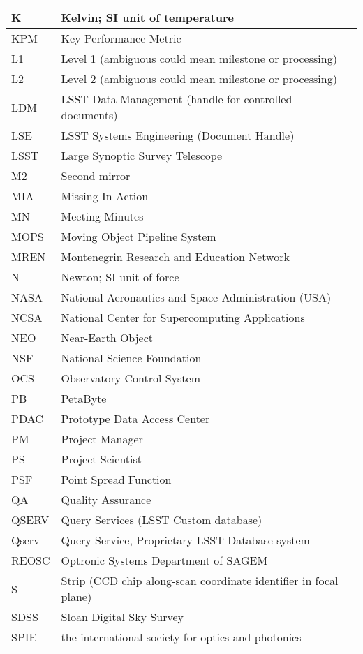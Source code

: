 \begin{longtable}{|l|p{}|}
K & Kelvin; SI unit of temperature \\\hline
KPM & Key Performance Metric \\\hline
L1 & Level 1 (ambiguous could mean milestone or processing) \\\hline
L2 & Level 2 (ambiguous could mean milestone or processing) \\\hline
LDM & LSST Data Management (handle for controlled documents) \\\hline
LSE & LSST Systems Engineering (Document Handle) \\\hline
LSST & Large Synoptic Survey Telescope \\\hline
M2 & Second mirror \\\hline
MIA & Missing In Action \\\hline
MN & Meeting Minutes \\\hline
MOPS & Moving Object Pipeline System \\\hline
MREN & Montenegrin Research and Education Network \\\hline
N & Newton; SI unit of force \\\hline
NASA & National Aeronautics and Space Administration (USA) \\\hline
NCSA & National Center for Supercomputing Applications \\\hline
NEO & Near-Earth Object \\\hline
NSF & National Science Foundation \\\hline
OCS & Observatory Control System \\\hline
PB & PetaByte \\\hline
PDAC & Prototype Data Access Center \\\hline
PM & Project Manager \\\hline
PS & Project Scientist \\\hline
PSF & Point Spread Function \\\hline
QA & Quality Assurance \\\hline
QSERV & Query Services (LSST Custom database) \\\hline
Qserv & Query Service, Proprietary LSST Database system \\\hline
REOSC & Optronic Systems Department of SAGEM \\\hline
S & Strip (CCD chip along-scan coordinate identifier in focal plane) \\\hline
SDSS & Sloan Digital Sky Survey \\\hline
SPIE & the international society for optics and photonics \\\hline

\end{longtable}
